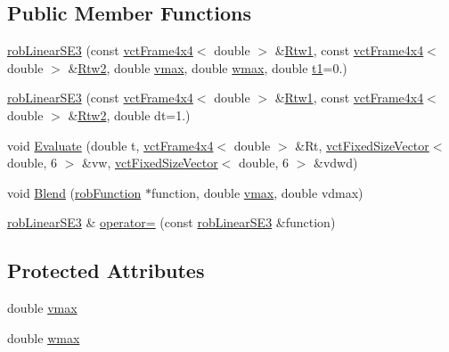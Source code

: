 \subsection*{Public Member Functions}
\begin{DoxyCompactItemize}
\item 
\hyperlink{classrob_linear_s_e3_aed2db77d51c20263461718f0f636e235}{rob\+Linear\+S\+E3} (const \hyperlink{classvct_frame4x4}{vct\+Frame4x4}$<$ double $>$ \&\hyperlink{classrob_function_s_e3_a16c18215d20446f2bd11e7f54ace81a6}{Rtw1}, const \hyperlink{classvct_frame4x4}{vct\+Frame4x4}$<$ double $>$ \&\hyperlink{classrob_function_s_e3_a06d362ebf89c4f6a3984c4097a810a27}{Rtw2}, double \hyperlink{classrob_linear_s_e3_a581ce540523b540cfcfb8619e5deb792}{vmax}, double \hyperlink{classrob_linear_s_e3_a691b0ddc307e875576d62f8e05762c1f}{wmax}, double \hyperlink{classrob_function_a9a4b408a3a5a8ae927caec3b6bac36ef}{t1}=0.)
\item 
\hyperlink{classrob_linear_s_e3_ade3248991253db8fecb41ba5a93a357c}{rob\+Linear\+S\+E3} (const \hyperlink{classvct_frame4x4}{vct\+Frame4x4}$<$ double $>$ \&\hyperlink{classrob_function_s_e3_a16c18215d20446f2bd11e7f54ace81a6}{Rtw1}, const \hyperlink{classvct_frame4x4}{vct\+Frame4x4}$<$ double $>$ \&\hyperlink{classrob_function_s_e3_a06d362ebf89c4f6a3984c4097a810a27}{Rtw2}, double dt=1.)
\item 
void \hyperlink{classrob_linear_s_e3_a569a3f137c16299a0de3f722ad06fdec}{Evaluate} (double t, \hyperlink{classvct_frame4x4}{vct\+Frame4x4}$<$ double $>$ \&Rt, \hyperlink{classvct_fixed_size_vector}{vct\+Fixed\+Size\+Vector}$<$ double, 6 $>$ \&vw, \hyperlink{classvct_fixed_size_vector}{vct\+Fixed\+Size\+Vector}$<$ double, 6 $>$ \&vdwd)
\item 
void \hyperlink{classrob_linear_s_e3_aaa90a72d6f596fcfce394017e5d86908}{Blend} (\hyperlink{classrob_function}{rob\+Function} $\ast$function, double \hyperlink{classrob_linear_s_e3_a581ce540523b540cfcfb8619e5deb792}{vmax}, double vdmax)
\item 
\hyperlink{classrob_linear_s_e3}{rob\+Linear\+S\+E3} \& \hyperlink{classrob_linear_s_e3_a016af98cbc9f4997d2ddc000dd8704ba}{operator=} (const \hyperlink{classrob_linear_s_e3}{rob\+Linear\+S\+E3} \&function)
\end{DoxyCompactItemize}
\subsection*{Protected Attributes}
\begin{DoxyCompactItemize}
\item 
double \hyperlink{classrob_linear_s_e3_a581ce540523b540cfcfb8619e5deb792}{vmax}
\item 
double \hyperlink{classrob_linear_s_e3_a691b0ddc307e875576d62f8e05762c1f}{wmax}
\end{DoxyCompactItemize}


